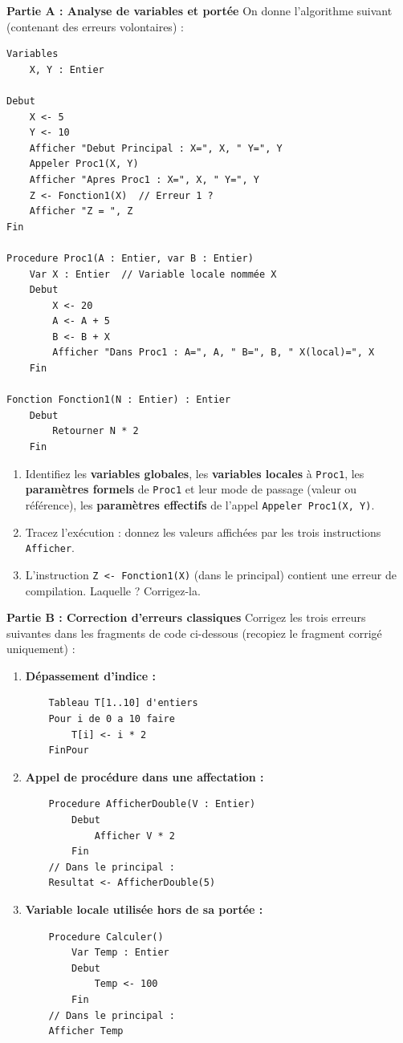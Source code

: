 \documentclass[11pt]{article}
\begin{document}
\begin{exercice}
\textbf{Partie A : Analyse de variables et portée}
On donne l'algorithme suivant (contenant des erreurs volontaires) :
\begin{lstlisting}
Variables
    X, Y : Entier

Debut
    X <- 5
    Y <- 10
    Afficher "Debut Principal : X=", X, " Y=", Y
    Appeler Proc1(X, Y)
    Afficher "Apres Proc1 : X=", X, " Y=", Y
    Z <- Fonction1(X)  // Erreur 1 ?
    Afficher "Z = ", Z
Fin

Procedure Proc1(A : Entier, var B : Entier)
    Var X : Entier  // Variable locale nommée X
    Debut
        X <- 20
        A <- A + 5
        B <- B + X
        Afficher "Dans Proc1 : A=", A, " B=", B, " X(local)=", X
    Fin

Fonction Fonction1(N : Entier) : Entier
    Debut
        Retourner N * 2
    Fin
\end{lstlisting}
\begin{enumerate}
    \item Identifiez les \textbf{variables globales}, les \textbf{variables locales} à \texttt{Proc1}, les \textbf{paramètres formels} de \texttt{Proc1} et leur mode de passage (valeur ou référence), les \textbf{paramètres effectifs} de l'appel \texttt{Appeler Proc1(X, Y)}.
    \item Tracez l'exécution : donnez les valeurs affichées par les trois instructions \texttt{Afficher}.
    \item L'instruction \texttt{Z <- Fonction1(X)} (dans le principal) contient une erreur de compilation. Laquelle ? Corrigez-la.
\end{enumerate}

\textbf{Partie B : Correction d'erreurs classiques}
Corrigez les trois erreurs suivantes dans les fragments de code ci-dessous (recopiez le fragment corrigé uniquement) :
\begin{enumerate}
    \item \textbf{Dépassement d'indice :}
    \begin{lstlisting}
    Tableau T[1..10] d'entiers
    Pour i de 0 a 10 faire
        T[i] <- i * 2
    FinPour
    \end{lstlisting}
    \item \textbf{Appel de procédure dans une affectation :}
    \begin{lstlisting}
    Procedure AfficherDouble(V : Entier)
        Debut
            Afficher V * 2
        Fin
    // Dans le principal :
    Resultat <- AfficherDouble(5)
    \end{lstlisting}
    \item \textbf{Variable locale utilisée hors de sa portée :}
    \begin{lstlisting}
    Procedure Calculer()
        Var Temp : Entier
        Debut
            Temp <- 100
        Fin
    // Dans le principal :
    Afficher Temp
    \end{lstlisting}
\end{enumerate}


\end{exercice}
\end{document}
